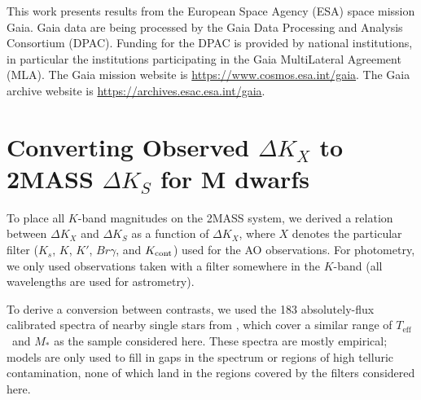 \documentclass[twocolumn]{aastex62}
\newcommand\teff{\ensuremath{T_\text{eff}}}
\begin{document}
This work presents results from the European Space Agency (ESA) space mission Gaia. Gaia data are being processed by the Gaia Data Processing and Analysis Consortium (DPAC). Funding for the DPAC is provided by national institutions, in particular the institutions participating in the Gaia MultiLateral Agreement (MLA). The Gaia mission website is \href{https://www.cosmos.esa.int/gaia}{https://www.cosmos.esa.int/gaia}. The Gaia archive website is \href{https://archives.esac.esa.int/gaia}{https://archives.esac.esa.int/gaia}.





\appendix 
\section{Converting Observed $\Delta K_X$ to 2MASS $\Delta K_S$ for M dwarfs}\label{sec:a1}
To place all $K$-band magnitudes on the 2MASS system, we derived a relation between $\Delta K_X$ and $\Delta K_S$ as a function of $\Delta K_X$, where $X$ denotes the particular filter ($K_s$, $K$, $K'$, $Br\gamma$, and $K_{\rm{cont}}$) used for the AO observations. For photometry, we only used observations taken with a filter somewhere in the $K$-band (all wavelengths are used for astrometry).

To derive a conversion between contrasts, we used the 183 absolutely-flux calibrated spectra of nearby single stars from \citet{Mann2015b}, which cover a similar range of \teff\ and $M_*$ as the sample considered here. These spectra are mostly empirical; models are only used to fill in gaps in the spectrum or regions of high telluric contamination, none of which land in the regions covered by the filters considered here.
\end{document}
